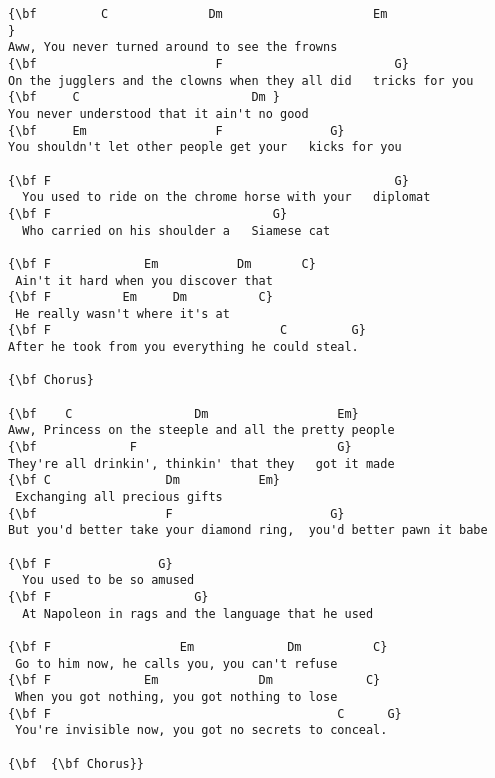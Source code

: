 \documentclass[a4paper]{article}
\begin{document}
\begin{Verbatim}[commandchars=\\\{\}]
{\bf         C              Dm                     Em                                            }
Aww, You never turned around to see the frowns 
{\bf                         F                        G}
On the jugglers and the clowns when they all did   tricks for you
{\bf     C                        Dm }
You never understood that it ain't no good
{\bf     Em                  F               G}
You shouldn't let other people get your   kicks for you

{\bf F                                                G}
  You used to ride on the chrome horse with your   diplomat
{\bf F                               G}
  Who carried on his shoulder a   Siamese cat

{\bf F             Em           Dm       C}
 Ain't it hard when you discover that
{\bf F          Em     Dm          C}
 He really wasn't where it's at
{\bf F                                C         G}
After he took from you everything he could steal.

{\bf Chorus}

{\bf    C                 Dm                  Em}
Aww, Princess on the steeple and all the pretty people
{\bf             F                            G}
They're all drinkin', thinkin' that they   got it made
{\bf C                Dm           Em}
 Exchanging all precious gifts
{\bf                  F                      G}
But you'd better take your diamond ring,  you'd better pawn it babe

{\bf F               G}
  You used to be so amused
{\bf F                    G}
  At Napoleon in rags and the language that he used

{\bf F                  Em             Dm          C}
 Go to him now, he calls you, you can't refuse
{\bf F             Em              Dm             C}
 When you got nothing, you got nothing to lose
{\bf F                                        C      G}
 You're invisible now, you got no secrets to conceal.

{\bf  {\bf Chorus}}
\end{Verbatim}
\newpage
\end{document}
